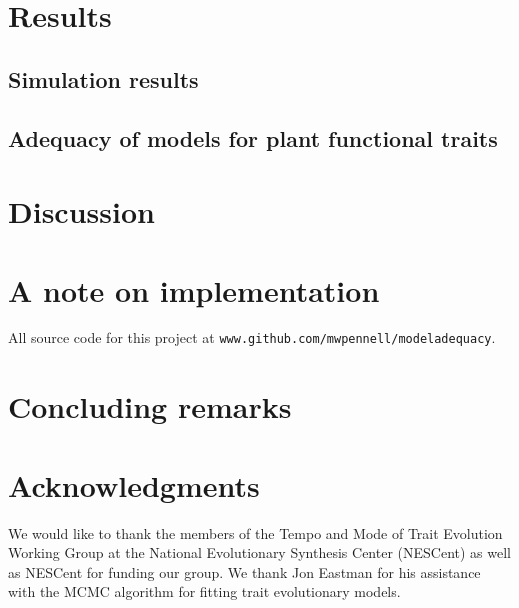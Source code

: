 \documentclass[12pt]{article}
\begin{document}
\section{Results}

\subsection{Simulation results}

\subsection{Adequacy of models for plant functional traits}


\section{Discussion}

\newpage
\section{A note on implementation}

All source code for this project at \texttt{www.github.com/mwpennell/modeladequacy}.

\section{Concluding remarks}


\section{Acknowledgments}

We would like to thank the members of the Tempo and Mode of Trait Evolution Working Group at the National Evolutionary Synthesis Center (NESCent) as well as NESCent for funding our group. We thank Jon Eastman for his assistance with the MCMC algorithm for fitting trait evolutionary models.



\newpage


\end{document}
